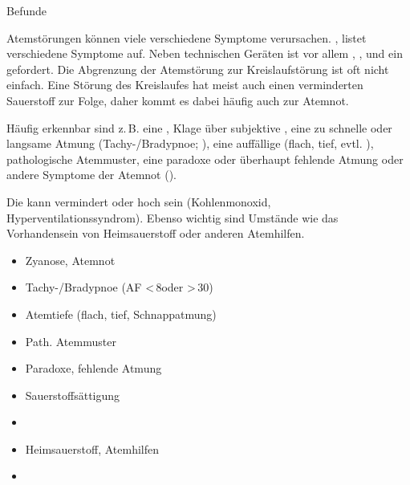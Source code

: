 {{\eye} Befunde}
{Atemstörungen können viele verschiedene Symptome
verursachen. , listet
verschiedene Symptome auf. Neben technischen Geräten ist vor
allem ,
,  und ein 
gefordert.
Die Abgrenzung der Atemstörung zur Kreislaufstörung ist oft
nicht einfach. Eine Störung des Kreislaufes hat meist auch
einen verminderten Sauerstoff zur Folge, daher
kommt es dabei häufig {auch} zur Atemnot.

Häufig erkennbar sind z.\,B. eine , 
Klage über subjektive , 
eine zu schnelle
oder langsame Atmung (Tachy-/Bradypnoe; 
), 
eine auffällige  (flach, tief, evtl. ), 
pathologische Atemmuster, 
eine paradoxe oder überhaupt fehlende Atmung oder 
andere Symptome der Atemnot
().

Die  kann vermindert 
oder hoch sein (Kohlenmonoxid, Hyperventilationssyndrom). 
Ebenso wichtig sind Umstände wie das Vorhandensein 
von Heimsauerstoff
oder anderen Atemhilfen.
}
{\begin{itemize}
  \item[\eye] Zyanose, Atemnot
  \item[\eye] Tachy-/Bradypnoe (AF <\,8\PerMin* oder >\,30\PerMin*)
  \item[\eye] Atemtiefe (flach, tief, Schnappatmung)
  \item[\eye] Path. Atemmuster
  \item[\eye] Paradoxe, fehlende Atmung
  \item[\eye] Sauerstoffsättigung
  \item[\eye] 
  \item[\eye] Heimsauerstoff, Atemhilfen
  \item[\eye] 
\end{itemize}
}
{}
{}
{}


